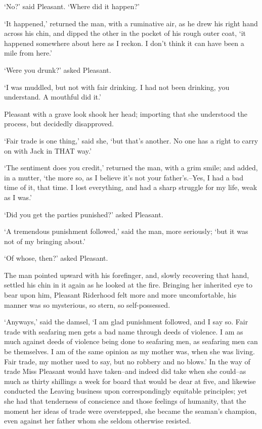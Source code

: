 ‘No?’ said Pleasant. ‘Where did it happen?’

‘It happened,’ returned the man, with a ruminative air, as he drew his
right hand across his chin, and dipped the other in the pocket of his
rough outer coat, ‘it happened somewhere about here as I reckon. I don’t
think it can have been a mile from here.’

‘Were you drunk?’ asked Pleasant.

‘I was muddled, but not with fair drinking. I had not been drinking, you
understand. A mouthful did it.’

Pleasant with a grave look shook her head; importing that she understood
the process, but decidedly disapproved.

‘Fair trade is one thing,’ said she, ‘but that’s another. No one has a
right to carry on with Jack in THAT way.’

‘The sentiment does you credit,’ returned the man, with a grim smile;
and added, in a mutter, ‘the more so, as I believe it’s not your
father’s.--Yes, I had a bad time of it, that time. I lost everything,
and had a sharp struggle for my life, weak as I was.’

‘Did you get the parties punished?’ asked Pleasant.

‘A tremendous punishment followed,’ said the man, more seriously; ‘but
it was not of my bringing about.’

‘Of whose, then?’ asked Pleasant.

The man pointed upward with his forefinger, and, slowly recovering that
hand, settled his chin in it again as he looked at the fire. Bringing
her inherited eye to bear upon him, Pleasant Riderhood felt more
and more uncomfortable, his manner was so mysterious, so stern, so
self-possessed.

‘Anyways,’ said the damsel, ‘I am glad punishment followed, and I say
so. Fair trade with seafaring men gets a bad name through deeds of
violence. I am as much against deeds of violence being done to seafaring
men, as seafaring men can be themselves. I am of the same opinion as my
mother was, when she was living. Fair trade, my mother used to say, but
no robbery and no blows.’ In the way of trade Miss Pleasant would have
taken--and indeed did take when she could--as much as thirty shillings
a week for board that would be dear at five, and likewise conducted the
Leaving business upon correspondingly equitable principles; yet she had
that tenderness of conscience and those feelings of humanity, that the
moment her ideas of trade were overstepped, she became the seaman’s
champion, even against her father whom she seldom otherwise resisted.

